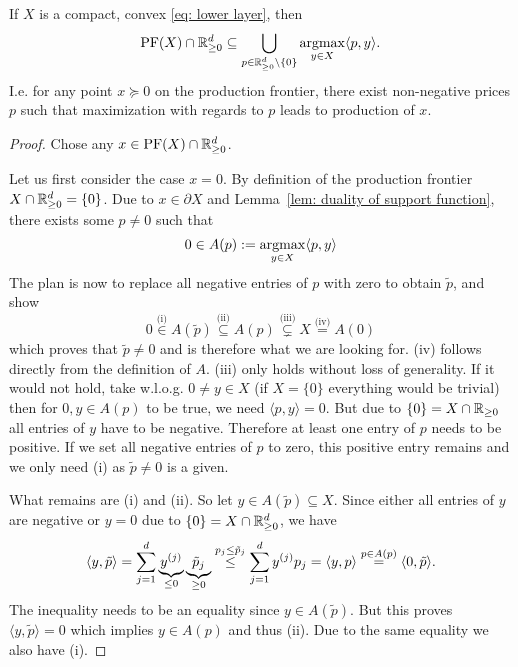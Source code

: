 \begin{theorem}
	\label{thm: prices facilitate reasonable production}
	If \(X\) is a compact, convex \ref{eq: lower layer}, then
	\[
		\operatorname{PF}(X)\cap \mathbb{R}_{\ge 0}^d \subseteq
		\bigcup_{p\in \mathbb{R}_{\ge 0}^d\setminus\{0\}}
		\operatorname*{argmax}_{y\in X}\langle p, y\rangle.
	\]
	I.e. for any point \(x\succeq 0\) on the production frontier, there exist
	non-negative prices \(p\) such that maximization with regards to \(p\) leads
	to production of \(x\).
\end{theorem}

\begin{proof}
	Chose any \(x\in \operatorname{PF}(X)\cap \mathbb{R}_{\ge 0}^d\). 

	Let us first consider the case \(x=0\). By definition of the production
	frontier \(X\cap \mathbb{R}_{\ge 0}^d=\{0\}\).  Due to \(x\in \partial X\) and
	Lemma~\ref{lem: duality of support function}, there exists some \(p\neq 0\)
	such that
	\[
		0\in A(p) := \operatorname*{argmax}_{y\in X}\langle p, y\rangle
	\]
	The plan is now to replace all negative entries of \(p\) with zero to obtain
	\(\tilde{p}\), and show 
	\[
		0 \overset{\text{(i)}}\in A(\tilde{p})
		\overset{\text{(ii)}}\subseteq A(p)
		\overset{\text{(iii)}}\subsetneq X \overset{\text{(iv)}}= A(0)
	\]
	which proves that \(\tilde{p}\neq 0\) and is therefore what we are looking
	for. (iv) follows directly from the definition of \(A\). (iii) only holds
	without loss of generality. If it would not hold, take w.l.o.g. \(0\neq y\in X\)
	(if \(X=\{0\}\) everything would be trivial) then for \(0,y\in A(p)\) to be
	true, we need \(\langle p, y\rangle =0\). But due to \(\{0\}=X\cap \mathbb{R}_{\ge
	0}\) all entries of \(y\) have to be negative. Therefore at least one entry
	of \(p\) needs to be positive. If we set all negative entries of \(p\) to
	zero, this positive entry remains and we only need (i) as \(\tilde{p}\neq 0\)
	is a given.

	What remains are (i) and (ii). So let \(y\in A(\tilde{p})\subseteq X\).
	Since either all entries of \(y\) are negative or \(y=0\) due to
	\(\{0\} = X\cap\mathbb{R}_{\ge 0}^d\), we have
	\[
		\langle y, \tilde{p}\rangle
		= \sum_{j=1}^d \underbrace{y^{(j)}}_{\le 0}
		\underbrace{\tilde{p}_j}_{\ge 0}
		\overset{p_j\le \tilde{p}_j}\le \sum_{j=1}^d y^{(j)} p_j
		= \langle y, p\rangle
		\overset{p\in A(p)}= \langle 0, \tilde{p}\rangle.
	\]
	The inequality needs to be an equality since \(y\in A(\tilde{p})\). But this
	proves \(\langle y, \tilde{p}\rangle = 0\) which implies \(y\in A(p)\) and
	thus (ii). Due to the same equality we also have (i).
	

\end{proof}
